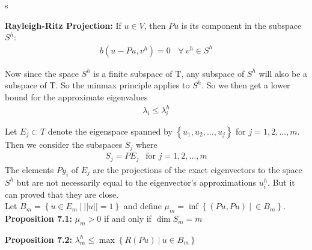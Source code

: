s\documentclass[../../main.tex]{subfiles}
\begin{document}
\textbf{Rayleigh-Ritz Projection:} If $u \in V$, then $Pu$ is its component in the subspace $S^{h}$:
\begin{align*}
b(u-Pu,v^{h}) = 0 \ \ \ \ \forall \ v^{h} \in S^{h}
\end{align*}

Now since the space $S^{h}$ is a finite subspace of T, any subspace of $S^{h}$ will also be a subspace of T. So the minmax principle applies to $S^{h}$. So we then get a lower bound for the approximate eigenvalues
\begin{align*}
\lambda_{i} \leq \lambda_{i}^{h}
\end{align*}


Let $E_{j} \subset T$ denote the eigenspace spanned by $\left\{u_{1},u_{2},...,u_{j}\right\}$ for $j = 1,2,...,m$. Then we consider the subspaces $S_{j}$ where
\begin{align*}
S_{j} = PE_{j} \ \ \textrm{ for } j = 1,2,...,m
\end{align*}
The elements $Py_{i}$ of $E_{j}$ are the projections of the exact eigenvectors to the space $S^{h}$ but are not necessarily equal to the eigenvector's approximations $u^{h}_{i}$. But it can proved that they are close.\\

Let $B_{m} = \left\{u\in E_{m} \ | \ ||u|| = 1\right\}$ and define $\mu_{m} = \inf\left\{ ( Pu,Pu) \ | \ \in B_{m} \right\}$.\\

\textbf{Proposition 7.1:} $\mu_{m} > 0$ if and only if $\dim S_{m} = m$\\

\begin{comment}
\textbf{Proof:} Suppose that $\dim S_{m} < m$, then the set of projected eigenvalues $\left\{Py_{1}, Py_{2},...,Py_{m}\right\}$ is a linearly dependent set. So then there exists a $u \in B_{m}$ such that $Pu = 0$. Then $\mu_{m} = 0$. So the result follows by the contra-positive. \qed \\


So we from here on assume that $S^{h}$ is such that $\dim S_{m} = m$.\\
\end{comment}

\textbf{Proposition 7.2:} $\lambda^{h}_{m} \leq \max\left\{R(Pu) \ | \ u \in B_{m} \right\}$\\
\end{document}
